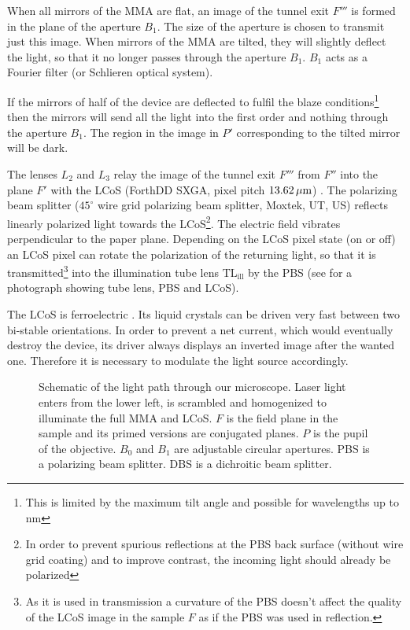 When all mirrors of the MMA are flat, an image of the tunnel exit $F'''$
is formed in the plane of the aperture $B_1$. The size of the aperture
is chosen to transmit just this image. When mirrors of the MMA are
tilted, they will slightly deflect the light, so that it no longer
passes through the aperture $B_1$. $B_1$ acts as a Fourier filter (or
Schlieren optical system).

If the mirrors of half of the device are deflected to fulfil the blaze
conditions\footnote{This is limited by the maximum tilt angle and
  possible for wavelengths up to \unit[1000]{nm}} then the mirrors will
send all the light into the first order and nothing through the
aperture $B_1$.  The region in the image in $P'$ corresponding to the
tilted mirror will be dark.

The lenses $L_2$ and $L_3$ relay the image of the tunnel exit $F'''$
from $F''$ into the plane $F'$ with the LCoS (ForthDD SXGA, pixel
pitch $\unit[13.62]{\mu m}$) \citep{Cartwright2007}. The polarizing
beam splitter ($45^\circ$ wire grid polarizing beam splitter, Moxtek,
UT, US) reflects linearly polarized light towards the LCoS\footnote{In
  order to prevent spurious reflections at the PBS back surface
  (without wire grid coating) and to improve contrast, the incoming
  light should already be polarized}. The electric field vibrates
perpendicular to the paper plane. Depending on the LCoS pixel state
(on or off) an LCoS pixel can rotate the polarization of the returning
light, so that it is transmitted\footnote{As it is used in
  transmission a curvature of the PBS doesn't affect the quality of
  the LCoS image in the sample $F$ as if the PBS was used in
  reflection.}  into the illumination tube lens
$\textrm{TL}_\textrm{ill}$ by the PBS (see  for a
photograph showing tube lens, PBS and LCoS).

The LCoS is ferroelectric \citetext{\citealp[see][]{1991Saleh} and
  \citealp[p.~192]{Goodman1996}}.  Its liquid crystals can be driven
very fast between two bi-stable orientations. In order to prevent a
net current, which would eventually destroy the device, its driver
always displays an inverted image after the wanted one. Therefore it
is necessary to modulate the light source accordingly.


\begin{figure}[H]
  \centering
  \def\svgscale{2}
  
  \caption{Schematic of the light path through our microscope. Laser
    light enters from the lower left, is scrambled and homogenized to
    illuminate the full MMA and LCoS. $F$ is the field plane in the
    sample and its primed versions are conjugated planes. $P$ is the
    pupil of the objective. $B_0$ and $B_1$ are adjustable circular
    apertures. PBS is a polarizing beam splitter. DBS is a dichroitic
    beam splitter.}
  \label{fig:memi-real}
\end{figure}


